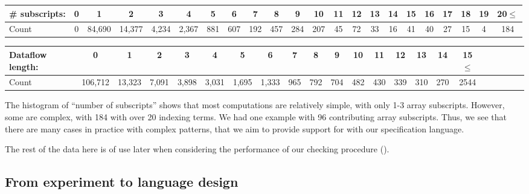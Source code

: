 
   \begin{center}     \begin{tabular}{l|ccccccccccccccccccccc}
   \textbf{\# subscripts}: & 0 & 1     & 2     & 3    &
                                                                       4
     & 5   & 6   & 7   & 8   & 9   & 10  & 11 & 12 & 13 & 14 & 15 & 16
     & 17 & 18 & 19 & 20$\leq$ \\\hline
   Count & 0 & 84,690 & 14,377 & 4,234 & 2,367 & 881 & 607 & 192 & 457 & 284 & 207 & 45 & 72 & 33 & 16 & 41 & 40 & 27 & 15 & 4  & 184
   \end{tabular}
\end{center}
   
 \begin{center}
\begin{tabular}{l|ccccccccccccccccccccc}
  \textbf{Dataflow length}: & 0      & 1     & 2    & 3
  & 4    & 5 & 6    & 7   & 8   & 9   & 10  & 11  & 12  & 13  & 14
  & 15$\leq$ \\\hline
  Count & 106,712 & 13,323 & 7,091 & 3,898 & 3,031 & 1,695 & 1,333 & 965 & 792 & 704 & 482 & 430 & 339 & 310 & 270 & 2544
\end{tabular}
\end{center}
%
The histogram of ``number of subscripts'' shows that most
computations are relatively simple, with only 1-3 array subscripts.
However, some are complex, with 184 with over 20 indexing terms. We had one example with 96
contributing array subscripts. Thus, we see that there are many cases
in practice with complex patterns, that we aim to provide support for
with our specification language.

The rest of the data here is of use later when considering the
performance of our checking procedure ().

\subsection{From experiment to language design}
\label{subsec:choices}

